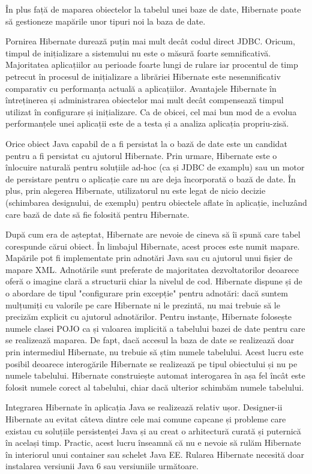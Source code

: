 \documentclass[12pt]{book}
\begin{document}
În plus față de maparea obiectelor la tabelul unei baze de date, Hibernate poate să gestioneze mapările unor tipuri noi la baza de date. 

Pornirea Hibernate durează puțin mai mult decât codul direct JDBC. Oricum, timpul de inițializare a sistemului nu este o măsură foarte semnificativă. Majoritatea aplicațiilor au perioade foarte lungi de rulare iar procentul de timp petrecut în procesul de inițializare a librăriei Hibernate este nesemnificativ comparativ cu performanța actuală a aplicațiilor. Avantajele Hibernate în întreținerea și administrarea obiectelor mai mult decât compensează timpul utilizat în configurare și inițializare. Ca de obicei, cel mai bun mod de a evolua performanțele unei aplicații este de a testa și a analiza aplicația propriu-zisă.

Orice obiect Java capabil de a fi persistat la o bază de date este un candidat pentru a fi persistat cu ajutorul Hibernate. Prin urmare, Hibernate este o înlocuire naturală pentru soluțiile ad-hoc (ca și JDBC de examplu) sau un motor de persistare pentru o aplicație care nu are deja încorporată o bază de date. În plus, prin alegerea Hibernate, utilizatorul nu este legat de nicio decizie (schimbarea designului, de exemplu) pentru obiectele aflate în aplicație, incluzând care bază de date să fie folosită pentru Hibernate.

După cum era de așteptat, Hibernate are nevoie de cineva să îi spună care tabel corespunde cărui obiect. În limbajul Hibernate, acest proces este numit mapare. Mapările pot fi implementate prin adnotări Java sau cu ajutorul unui fișier de mapare XML. Adnotările sunt preferate de majoritatea dezvoltatorilor deoarece oferă o imagine clară a structurii chiar la nivelul de cod. Hibernate dispune și de o abordare de tipul "configurare prin excepție" pentru adnotări: dacă suntem mulțumiți cu valorile pe care Hibernate ni le prezintă, nu mai trebuie să le precizăm explicit cu ajutorul adnotărilor. Pentru instanțe, Hibernate folosește numele clasei POJO ca și valoarea implicită a tabelului bazei de date pentru care se realizează maparea. De fapt, dacă accesul la baza de date se realizează doar prin intermediul Hibernate, nu trebuie să știm numele tabelului. Acest lucru este posibil deoarece interogările Hibernate se realizează pe tipul obiectului și nu pe numele tabelului. Hibernate construiește automat interogarea în așa fel încât este folosit numele corect al tabelului, chiar dacă ulterior schimbăm numele tabelului. 

Integrarea Hibernate în aplicația Java se realizează relativ ușor. Designer-ii Hibernate au evitat câteva dintre cele mai comune capcane și probleme care existau cu soluțiile persistenței Java și au creat o arhitectură curată și puternică în același timp. Practic, acest lucru înseamnă că nu e nevoie să rulăm Hibernate în interiorul unui container sau schelet Java EE. Rularea Hibernate necesită doar instalarea versiunii Java 6 sau versiuniile următoare.
\end{document}
